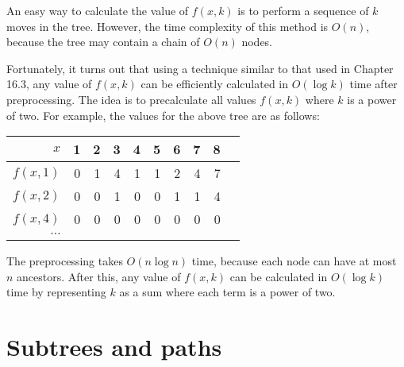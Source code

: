 An easy way to calculate the value of $f(x,k)$
is to perform a sequence of $k$ moves in the tree.
However, the time complexity of this method
is $O(n)$, because the tree may contain
a chain of $O(n)$ nodes.

Fortunately, it turns out that
using a technique similar to that
used in Chapter 16.3, any value of $f(x,k)$
can be efficiently calculated in $O(\log k)$ time
after preprocessing.
The idea is to precalculate all values $f(x,k)$
where $k$ is a power of two.
For example, the values for the above tree
are as follows:

\begin{center}
\begin{tabular}{r|rrrrrrrrr}
$x$ & 1 & 2 & 3 & 4 & 5 & 6 & 7 & 8 \\
\hline
$f(x,1)$ & 0 & 1 & 4 & 1 & 1 & 2 & 4 & 7 \\
$f(x,2)$ & 0 & 0 & 1 & 0 & 0 & 1 & 1 & 4 \\
$f(x,4)$ & 0 & 0 & 0 & 0 & 0 & 0 & 0 & 0 \\
$\cdots$ \\
\end{tabular}
\end{center}

The preprocessing takes $O(n \log n)$ time,
because each node can have at most $n$ ancestors.
After this, any value of $f(x,k)$ can be calculated
in $O(\log k)$ time by representing $k$
as a sum where each term is a power of two.

\section{Subtrees and paths}


